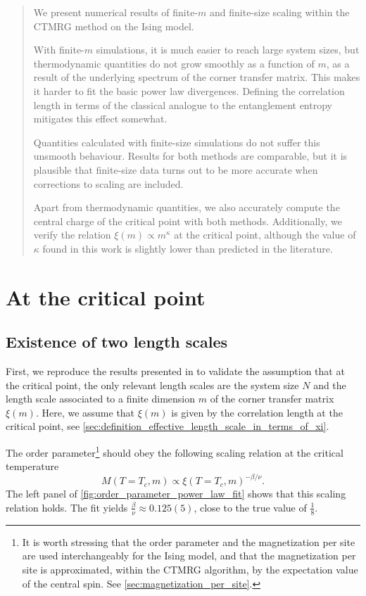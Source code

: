 \begin{abstract}
\noindent We present numerical results of finite-$m$ and finite-size scaling within the CTMRG method on the Ising model.

With finite-$m$ simulations, it is much easier to reach large system sizes,
but thermodynamic quantities do not grow smoothly as a function of $m$,
as a result of the underlying spectrum of the corner transfer matrix.
This makes it harder to fit the basic power law divergences. Defining the correlation length in terms of the classical
analogue to the entanglement entropy mitigates this effect somewhat.

Quantities calculated with finite-size simulations do not suffer this unsmooth behaviour.
Results for both methods are comparable, but it is plausible that finite-size data turns out to be more accurate when
corrections to scaling are included.

Apart from thermodynamic quantities, we also accurately compute the central charge of the critical point with both
methods.
Additionally, we verify the relation $\xi(m) \propto m^{\kappa}$ at the critical point,
although the value of $\kappa$ found in this work is slightly lower than predicted in the literature.
\end{abstract}

\section{At the critical point}

\subsection{Existence of two length scales}

First, we reproduce the results presented in \cite{nishino1996numerical} to validate the assumption that at the critical
point, the only relevant length scales are the system size $N$ and the length scale associated to a finite dimension $m$
of the corner transfer matrix $\xi(m)$.
Here, we assume that $\xi(m)$ is given by the correlation length at the critical point,
see \autoref{sec:definition_effective_length_scale_in_terms_of_xi}.

The order parameter\footnote{It is worth stressing that the order parameter and the magnetization per site are used
interchangeably for the Ising model, and that the magnetization per site is approximated,
within the CTMRG algorithm, by the expectation value of the central spin.
See \autoref{sec:magnetization_per_site}.} should obey the following scaling relation at the critical temperature
\begin{equation}\label{eq:order_param_scaling_relation_finite_m}
  M(T = T_c,m) \propto \xi(T = T_c, m)^{-\beta/\nu}.
\end{equation}
The left panel of \autoref{fig:order_parameter_power_law_fit} shows that this scaling relation holds.
The fit yields $\frac{\beta}{\nu} \approx 0.125(5)$, close to the true value of $\frac{1}{8}$.

